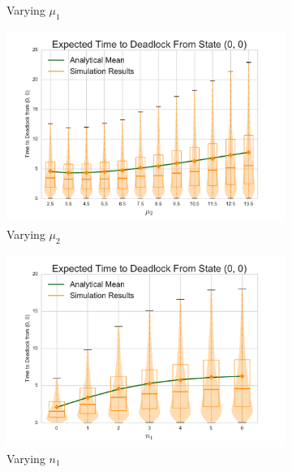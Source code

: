 \documentclass{article}
\begin{document}
\begin{figure}[H]
\begin{subfigure}[b]{0.5\textwidth}
  \caption{Varying $\mu_1$}
  \label{fig:timestodeadlockfb_mu1}
\end{subfigure}
\begin{subfigure}[b]{0.5\textwidth}
  \includegraphics[width=\textwidth]{images/vary_mu2fb}
  \caption{Varying $\mu_2$}
  \label{fig:timestodeadlockfb_mu2}
\end{subfigure}
\begin{subfigure}[b]{0.5\textwidth}
  \includegraphics[width=\textwidth]{images/vary_n1fb}
  \caption{Varying $n_1$}
  \label{fig:timestodeadlockfb_n1}
\end{subfigure}
\begin{subfigure}[b]{0.5\textwidth}

\end{subfigure}
\end{figure}
\end{document}
